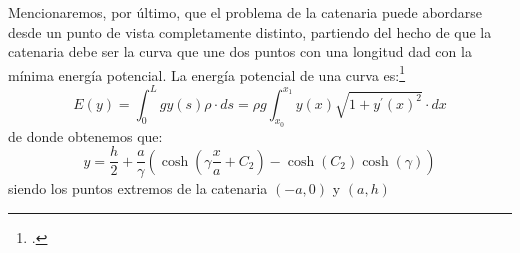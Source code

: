 Mencionaremos, por último, que el problema de la catenaria puede abordarse desde un punto de vista completamente distinto, partiendo del hecho de que la catenaria debe ser la curva que une dos puntos con una longitud dad con la mínima energía potencial. La energía potencial de una curva es:\footcite{Car12}
\[E(y)= \int_{0}^{L} gy(s)\rho \cdot ds=\rho g \int_{x_{0}}^{x_{1}} y(x) \sqrt{1+y^{'}(x)^{2}} \cdot dx\]
de donde obtenemos que:
\[y=\frac{h}{2}+\frac{a}{\gamma}(\cosh(\gamma \frac{x}{a} +C_{2})-\cosh(C_{2})\cosh(\gamma) )\]
siendo los puntos extremos de la catenaria $(-a,0)$ y $(a,h)$


